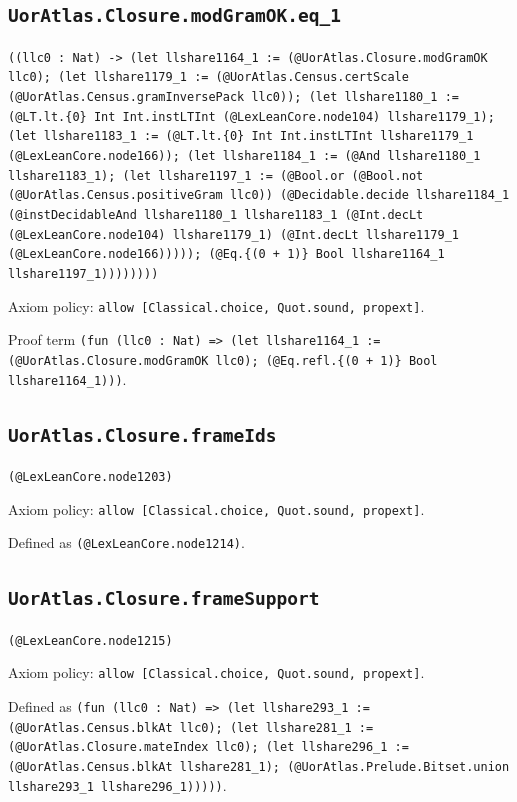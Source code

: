 \documentclass[11pt]{article}
\begin{document}
\subsection*{\texttt{UorAtlas.Closure.modGramOK.eq\_1}}
\noindent\texttt{((llc0 : Nat) -> (let llshare1164\_1 := (@UorAtlas.Closure.modGramOK llc0); (let llshare1179\_1 := (@UorAtlas.Census.certScale (@UorAtlas.Census.gramInversePack llc0)); (let llshare1180\_1 := (@LT.lt.\{0\} Int Int.instLTInt (@LexLeanCore.node104) llshare1179\_1); (let llshare1183\_1 := (@LT.lt.\{0\} Int Int.instLTInt llshare1179\_1 (@LexLeanCore.node166)); (let llshare1184\_1 := (@And llshare1180\_1 llshare1183\_1); (let llshare1197\_1 := (@Bool.or (@Bool.not (@UorAtlas.Census.positiveGram llc0)) (@Decidable.decide llshare1184\_1 (@instDecidableAnd llshare1180\_1 llshare1183\_1 (@Int.decLt (@LexLeanCore.node104) llshare1179\_1) (@Int.decLt llshare1179\_1 (@LexLeanCore.node166))))); (@Eq.\{(0 + 1)\} Bool llshare1164\_1 llshare1197\_1))))))))}\par
\noindent Axiom policy: \texttt{allow [Classical.choice, Quot.sound, propext]}.\par
\noindent Proof term \texttt{(fun (llc0 : Nat) => (let llshare1164\_1 := (@UorAtlas.Closure.modGramOK llc0); (@Eq.refl.\{(0 + 1)\} Bool llshare1164\_1)))}.\par
\subsection*{\texttt{UorAtlas.Closure.frameIds}}
\noindent\texttt{(@LexLeanCore.node1203)}\par
\noindent Axiom policy: \texttt{allow [Classical.choice, Quot.sound, propext]}.\par
\noindent Defined as \texttt{(@LexLeanCore.node1214)}.\par
\subsection*{\texttt{UorAtlas.Closure.frameSupport}}
\noindent\texttt{(@LexLeanCore.node1215)}\par
\noindent Axiom policy: \texttt{allow [Classical.choice, Quot.sound, propext]}.\par
\noindent Defined as \texttt{(fun (llc0 : Nat) => (let llshare293\_1 := (@UorAtlas.Census.blkAt llc0); (let llshare281\_1 := (@UorAtlas.Closure.mateIndex llc0); (let llshare296\_1 := (@UorAtlas.Census.blkAt llshare281\_1); (@UorAtlas.Prelude.Bitset.union llshare293\_1 llshare296\_1)))))}.\par
\end{document}
